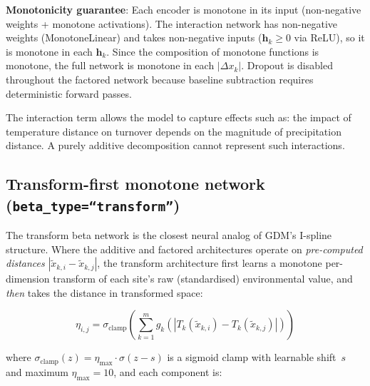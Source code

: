 \documentclass{article}
\begin{document}
\textbf{Monotonicity guarantee}: Each encoder is monotone in its input (non-negative weights + monotone activations). The interaction network has non-negative weights (MonotoneLinear) and takes non-negative inputs ($\mathbf{h}_k \geq 0$ via ReLU), so it is monotone in each $\mathbf{h}_k$. Since the composition of monotone functions is monotone, the full network is monotone in each $|\Delta x_k|$. Dropout is disabled throughout the factored network because baseline subtraction requires deterministic forward passes.

The interaction term allows the model to capture effects such as: the impact of temperature distance on turnover depends on the magnitude of precipitation distance. A purely additive decomposition cannot represent such interactions.

\subsection{Transform-first monotone network (\texttt{beta\_type=``transform''})}
\label{sec:transform-beta}

The transform beta network is the closest neural analog of GDM's I-spline structure. Where the additive and factored architectures operate on \emph{pre-computed distances} $|\tilde{x}_{k,i} - \tilde{x}_{k,j}|$, the transform architecture first learns a monotone per-dimension transform of each site's raw (standardised) environmental value, and \emph{then} takes the distance in transformed space:

\begin{equation}
    \eta_{i,j} = \sigma_{\text{clamp}}\!\left(\sum_{k=1}^{m} g_k\!\left(\left|T_k(\tilde{x}_{k,i}) - T_k(\tilde{x}_{k,j})\right|\right)\right)
    \label{eq:transform-beta}
\end{equation}

where $\sigma_{\text{clamp}}(z) = \eta_{\max} \cdot \sigma(z - s)$ is a sigmoid clamp with learnable shift~$s$ and maximum $\eta_{\max} = 10$, and each component is:
\end{document}
